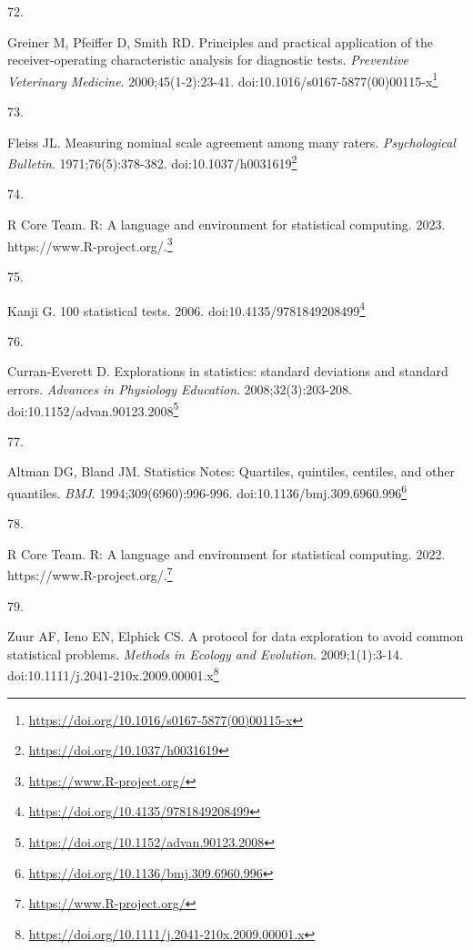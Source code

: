 \documentclass[
  a4paper,
]{book}
\newlength{\cslhangindent}
\newlength{\csllabelwidth}
\newlength{\cslentryspacingunit} %
\newenvironment{CSLReferences}[2] %
 {%
  \setlength{\parindent}{0pt}
  \ifodd #1
  \let\oldpar\par
  \def\par{\hangindent=\cslhangindent\oldpar}
  \fi
  \setlength{\parskip}{#2\cslentryspacingunit}
 }%
 {}
\newcommand{\CSLLeftMargin}[1]{\parbox[t]{\csllabelwidth}{#1}}
\newcommand{\CSLRightInline}[1]{\parbox[t]{\linewidth - \csllabelwidth}{#1}\break}
\renewcommand{\href}[2]{#2\footnote{\url{#1}}}
\begin{document}
\begin{CSLReferences}{0}{0}
\leavevmode{}%
\CSLLeftMargin{72. }%
\CSLRightInline{Greiner M, Pfeiffer D, Smith RD. Principles and practical application of the receiver-operating characteristic analysis for diagnostic tests. \emph{Preventive Veterinary Medicine}. 2000;45(1-2):23-41. doi:\href{https://doi.org/10.1016/s0167-5877(00)00115-x}{10.1016/s0167-5877(00)00115-x}}

\leavevmode{}%
\CSLLeftMargin{73. }%
\CSLRightInline{Fleiss JL. Measuring nominal scale agreement among many raters. \emph{Psychological Bulletin}. 1971;76(5):378-382. doi:\href{https://doi.org/10.1037/h0031619}{10.1037/h0031619}}

\leavevmode{}%
\CSLLeftMargin{74. }%
\CSLRightInline{R Core Team. R: A language and environment for statistical computing. 2023. \href{https://www.R-project.org/}{https://www.R-project.org/.}}

\leavevmode{}%
\CSLLeftMargin{75. }%
\CSLRightInline{Kanji G. 100 statistical tests. 2006. doi:\href{https://doi.org/10.4135/9781849208499}{10.4135/9781849208499}}

\leavevmode{}%
\CSLLeftMargin{76. }%
\CSLRightInline{Curran-Everett D. Explorations in statistics: standard deviations and standard errors. \emph{Advances in Physiology Education}. 2008;32(3):203-208. doi:\href{https://doi.org/10.1152/advan.90123.2008}{10.1152/advan.90123.2008}}

\leavevmode{}%
\CSLLeftMargin{77. }%
\CSLRightInline{Altman DG, Bland JM. Statistics Notes: Quartiles, quintiles, centiles, and other quantiles. \emph{BMJ}. 1994;309(6960):996-996. doi:\href{https://doi.org/10.1136/bmj.309.6960.996}{10.1136/bmj.309.6960.996}}

\leavevmode{}%
\CSLLeftMargin{78. }%
\CSLRightInline{R Core Team. R: A language and environment for statistical computing. 2022. \href{https://www.R-project.org/}{https://www.R-project.org/.}}

\leavevmode{}%
\CSLLeftMargin{79. }%
\CSLRightInline{Zuur AF, Ieno EN, Elphick CS. A protocol for data exploration to avoid common statistical problems. \emph{Methods in Ecology and Evolution}. 2009;1(1):3-14. doi:\href{https://doi.org/10.1111/j.2041-210x.2009.00001.x}{10.1111/j.2041-210x.2009.00001.x}}


\end{CSLReferences}
\end{document}
